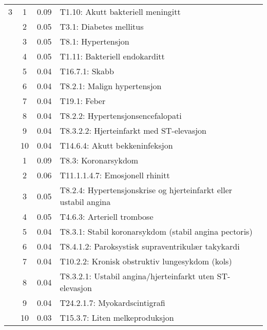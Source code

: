 \begin{table}[htbp]
\begin{tabular}{c c c l}
    3 & 1 & 0.09 & T1.10: Akutt bakteriell meningitt \\
     & 2 & 0.05 & T3.1: Diabetes mellitus \\
     & 3 & 0.05 & T8.1: Hypertensjon \\
     & 4 & 0.05 & T1.11: Bakteriell endokarditt \\
     & 5 & 0.04 & T16.7.1: Skabb \\
     & 6 & 0.04 & T8.2.1: Malign hypertensjon \\
     & 7 & 0.04 & T19.1: Feber \\
     & 8 & 0.04 & T8.2.2: Hypertensjonsencefalopati \\
     & 9 & 0.04 & T8.3.2.2: Hjerteinfarkt med ST-elevasjon \\
     & 10 & 0.04 & T14.6.4: Akutt bekkeninfeksjon \\
	\addlinespace
    4 & 1 & 0.09 & T8.3: Koronarsykdom \\
     & 2 & 0.06 & T11.1.1.4.7: Emosjonell rhinitt \\
     & 3 & 0.05 & T8.2.4: Hypertensjonskrise og hjerteinfarkt eller ustabil angina \\
     & 4 & 0.05 & T4.6.3: Arteriell trombose \\
     & 5 & 0.04 & T8.3.1: Stabil koronarsykdom (stabil angina pectoris) \\
     & 6 & 0.04 & T8.4.1.2: Paroksystisk supraventrikulær takykardi \\
     & 7 & 0.04 & T10.2.2: Kronisk obstruktiv lungesykdom (kols) \\
     & 8 & 0.04 & T8.3.2.1: Ustabil angina/hjerteinfarkt uten ST-elevasjon \\
     & 9 & 0.04 & T24.2.1.7: Myokardscintigrafi \\
     & 10 & 0.03 & T15.3.7: Liten melkeproduksjon \\
	\bottomrule
\end{tabular}
\end{table}

